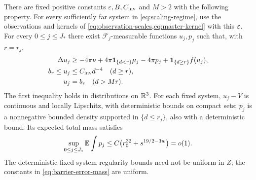 \begin{proposition}\label{prop:barrier-invariant}
There are fixed positive constants $\varepsilon,B,C_{\mathrm{inv}}$ and $M>2$
with the following property.  For every sufficiently far system in
\cref{eq:scaling-regime}, use the observations and kernels of
\cref{eq:observation-scales,eq:master-kernel} with this $\varepsilon$.
For every $0\le j\le J_*$ there exist $\mathcal F_j$-measurable
functions $u_j,p_j$ such that, with $r=r_j$,
\begin{equation}\label{eq:barrier-invariant}
 \begin{aligned}
 \Delta u_j&\ge-4\pi\nu
       +4\pi\mathbf 1_{\{d<r\}}\mu_j-4\pi p_j
       +\mathbf 1_{\{d\ge r\}}f(u_j),\\
 b_r\le u_j&\le C_{\mathrm{inv}}d^{-4}\quad(d\ge r),\\
 u_j&=b_r\quad(d>Mr).
 \end{aligned}
\end{equation}
The first inequality holds in distributions on $\mathbb R^3$.
For each fixed system, $u_j-V$ is continuous and locally Lipschitz,
with deterministic bounds on compact sets; $p_j$ is a nonnegative
bounded density supported in $\{d\le r_j\}$, also with a deterministic
bound.  Its expected total mass satisfies
\begin{equation}\label{eq:barrier-error-mass}
 \sup_{0\le j\le J_*}\mathbb E\int p_j
 \le C\bigl(r_0^{32}+s^{19/2-3w}\bigr)=o(1).
\end{equation}
The deterministic fixed-system regularity bounds need not be uniform
in $Z$; the constants in \cref{eq:barrier-error-mass} are uniform.
\end{proposition}

